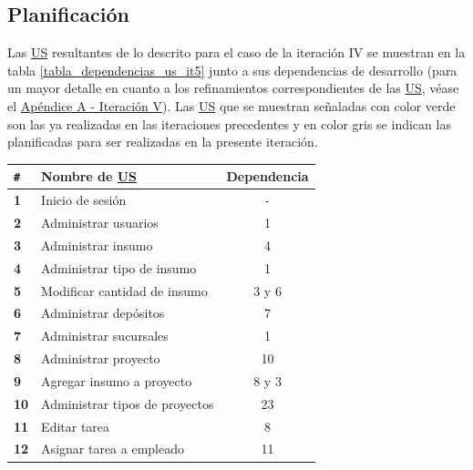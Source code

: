 \documentclass[a4paper, 12pt,twoside]{report}  %
\numberwithin{equation}{subsection} %
\begin{document}
\subsection{Planificación}
Las \hyperlink{US}{US} resultantes de lo descrito para el caso de la iteración IV se muestran en la tabla \ref{tabla_dependencias_us_it5} junto a sus dependencias de desarrollo (para un mayor detalle en cuanto a los refinamientos correspondientes de las \hyperlink{US}{US}, véase el \hyperlink{apendice_a_V}{Apéndice A - Iteración V}). Las \hyperlink{US}{US} que se muestran señaladas con color verde son las ya realizadas en las iteraciones precedentes y en color gris se indican las planificadas para ser realizadas en la presente iteración.

\begin{table}[h!]
	\centering
	\begin{tabular}{ |p{0.5cm}|p{10cm}|c|  }
		\hline
		\verb|#|& \textbf{Nombre de \hyperlink{US}{US}}& \textbf{Dependencia} \\
		\hline
		\textbf{1} & \cellcolor{marca_US_realizada_anterior}Inicio de sesión & - \\
		\hline
		\textbf{2} & \cellcolor{marca_US_realizada_anterior}Administrar usuarios & 1 \\
		\hline
		\textbf{3} & \cellcolor{marca_US_realizada_anterior}Administrar insumo & 4 \\
		\hline
		\textbf{4} & \cellcolor{marca_US_realizada_anterior}Administrar tipo de insumo & 1 \\
		\hline
		\textbf{5} & \cellcolor{marca_US_realizada_anterior}Modificar cantidad de insumo & 3 y 6 \\
		\hline
		\textbf{6} & \cellcolor{marca_US_realizada_anterior}Administrar depósitos & 7 \\
		\hline
		\textbf{7} & \cellcolor{marca_US_realizada_anterior}Administrar sucursales & 1 \\
		\hline
		\textbf{8} & \cellcolor{marca_US_realizada_anterior}Administrar proyecto & 10 \\
		\hline
		\textbf{9} & \cellcolor{marca_US_realizada_anterior}Agregar insumo a proyecto & 8 y 3 \\
		\hline
		\textbf{10} & \cellcolor{marca_US_realizada_anterior}Administrar tipos de proyectos & 23 \\
		\hline
		\textbf{11} & \cellcolor{marca_US_realizada_anterior}Editar tarea & 8 \\
		\hline
		\textbf{12} & \cellcolor{marca_US_realizada_anterior}Asignar tarea a empleado & 11\\

\end{tabular}
\end{table}
\end{document}

